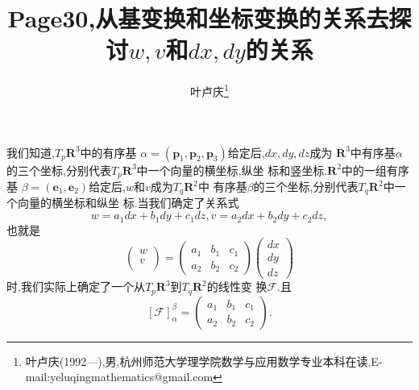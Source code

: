 \documentclass[a4paper]{article}
\begin{document}
\title{\huge{\bf{Page30,从基变换和坐标变换的关系去探讨$w,v$和$dx,dy$的关系}}} \author{\small{叶卢庆\footnote{叶卢庆(1992---),男,杭州师范大学理学院数学与应用数学专业本科在读,E-mail:yeluqingmathematics@gmail.com}}}
\maketitle
我们知道,$T_{p}\mathbf{R}^{3}$中的有序基
$\alpha=(\mathbf{p}_{1},\mathbf{p}_{2},\mathbf{p}_3)$给定后,$dx,dy,dz$成为
$\mathbf{R}^3$中有序基$\alpha$的三个坐标,分别代表$T_p\mathbf{R}^{3}$中一个向量的横坐标,纵坐
标和竖坐标.$\mathbf{R}^2$中的一组有序基
$\beta=(\mathbf{e}_1,\mathbf{e}_2)$给定后,$w$和$v$成为$T_{q}\mathbf{R}^2$中
有序基$\beta$的三个坐标,分别代表$T_{q}\mathbf{R}^2$中一个向量的横坐标和纵坐
标.当我们确定了关系式
$$
w=a_1dx+b_{1}dy+c_1dz,v=a_2dx+b_2dy+c_2dz,
$$
也就是
$$
\begin{pmatrix}
  w\\
v\\
\end{pmatrix}=
\begin{pmatrix}
  a_1&b_1&c_1\\
a_2&b_2&c_2
\end{pmatrix}
\begin{pmatrix}
  dx\\
dy\\
dz
\end{pmatrix}
$$
时,我们实际上确定了一个从$T_p\mathbf{R}^3$到$T_q\mathbf{R}^2$的线性变
换$\mathcal{F}$.且
$$
[\mathcal{F}]_{\alpha}^{\beta}=\begin{pmatrix}
  a_1&b_1&c_1\\
a_2&b_2&c_2
\end{pmatrix}.
$$
\end{document}
